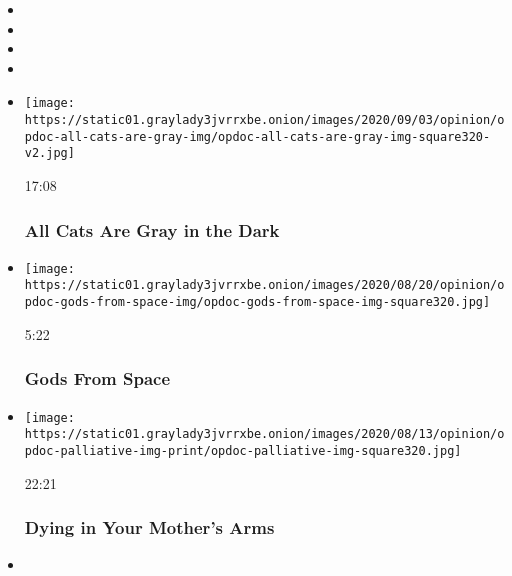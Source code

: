 \begin{itemize}
\item
\item
\item
\item
\end{itemize}

\begin{itemize}
\item
  \href{https://www.nytimes3xbfgragh.onion/video/opinion/100000007304962/all-cats-are-gray-in-the-dark.html?action=click\&module=video-series-bar\&region=header\&pgtype=Article\&playlistId=video/op-docs}{}

  \texttt{[image: https://static01.graylady3jvrrxbe.onion/images/2020/09/03/opinion/opdoc-all-cats-are-gray-img/opdoc-all-cats-are-gray-img-square320-v2.jpg]}

  17:08

  \hypertarget{all-cats-are-gray-in-the-dark}{%
  \subsubsection{All Cats Are Gray in the
  Dark}\label{all-cats-are-gray-in-the-dark}}
\item
  \href{https://www.nytimes3xbfgragh.onion/video/opinion/100000006831441/gods-from-space.html?action=click\&module=video-series-bar\&region=header\&pgtype=Article\&playlistId=video/op-docs}{}

  \texttt{[image: https://static01.graylady3jvrrxbe.onion/images/2020/08/20/opinion/opdoc-gods-from-space-img/opdoc-gods-from-space-img-square320.jpg]}

  5:22

  \hypertarget{gods-from-space}{%
  \subsubsection{Gods From Space}\label{gods-from-space}}
\item
  \href{https://www.nytimes3xbfgragh.onion/video/opinion/100000007249913/dying-in-your-mothers-arms.html?action=click\&module=video-series-bar\&region=header\&pgtype=Article\&playlistId=video/op-docs}{}

  \texttt{[image: https://static01.graylady3jvrrxbe.onion/images/2020/08/13/opinion/opdoc-palliative-img-print/opdoc-palliative-img-square320.jpg]}

  22:21

  \hypertarget{dying-in-your-mothers-arms}{%
  \subsubsection{Dying in Your Mother's
  Arms}\label{dying-in-your-mothers-arms}}
\item
  \href{https://www.nytimes3xbfgragh.onion/video/opinion/100000007247238/tears-teacher.html?action=click\&module=video-series-bar\&region=header\&pgtype=Article\&playlistId=video/op-docs}{}


\end{itemize}
